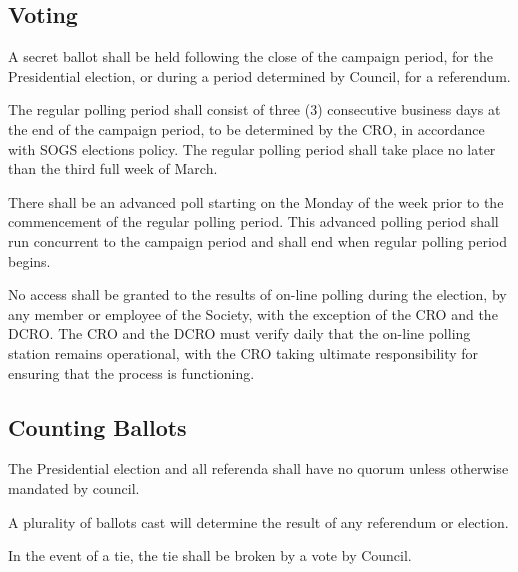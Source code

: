 \subsection{Voting}
\begin{longenum}[ label*=\thesubsection.\arabic*., align=left]
	\item A secret ballot shall be held following the close of the campaign period, for the Presidential election, or during a period determined by Council, for a referendum.
    \item The regular polling period shall consist of three (3) consecutive business days at the end of the campaign period, to be determined by the CRO, in accordance with SOGS elections policy. The regular polling period shall take place no later than the third full week of March.
    \begin{longenum}[ label*=\arabic*., align=left]
		\item There shall be an advanced poll starting on the Monday of the week prior to the commencement of the regular polling period. This advanced polling period shall run concurrent to the campaign period and shall end when regular polling period begins.
	\end{longenum}
    \item No access shall be granted to the results of on-line polling during the election, by any member or employee of the Society, with the exception of the CRO and the DCRO. The CRO and the DCRO must verify daily that the on-line polling station remains operational, with the CRO taking ultimate responsibility for ensuring that the process is functioning.
\end{longenum}
\subsection{Counting Ballots}

\begin{longenum}[ label*=\thesubsection.\arabic*., align=left]
	\item The Presidential election and all referenda shall have no quorum unless otherwise mandated by council.
    \item A plurality of ballots cast will determine the result of any referendum or election.
    \item In the event of a tie, the tie shall be broken by a vote by Council.
\end{longenum}

